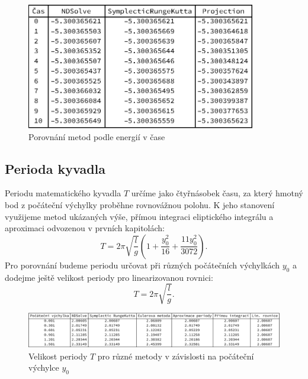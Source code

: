 {\begin{description}
\begin{figure}[h]
  \centering
  \includegraphics[width=10cm]{figures/TAB1.eps}
  \caption{Porovnání metod podle energií v čase}
  \label{fig:tab}
\end{figure}



\end{description}

\subsection{Perioda kyvadla}
\label{sec:Perioda}

Periodu matematického kyvadla $T$ určíme jako čtyřnásobek času, za který hmotný bod z počáteční výchylky proběhne rovnovážnou polohu. K jeho stanovení využijeme metod ukázaných výše, přímou integraci eliptického integrálu a aproximaci odvozenou v prvních kapitolách:
\begin{equation}
\label{aproxperiod}
T= 2 \pi \sqrt{\frac{l}{g}} \left( 1 + \frac{y_{0}^{2}}{16} + \frac{11y_{0}^{2}}{3072} \right) .
\end{equation}
Pro porovnání budeme periodu určovat při různých počátečních výchylkách $y_{0}$ a dodejme ještě velikost periody pro linearizovanou rovnici:
\begin{equation}
\label{aproxperiod}
T= 2 \pi \sqrt{\frac{l}{g}}.
\end{equation}

\begin{figure}[h]
  \centering
  \includegraphics[width=17cm]{figures/perTab.pdf}
  \caption{Velikost periody $T$ pro různé metody v závislosti na počáteční výchylce $y_{0}$}
  \label{fig:pertab}
\end{figure}

}
